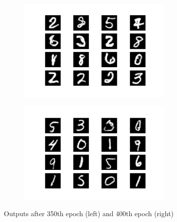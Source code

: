 \documentclass{article}
\begin{document}
\begin{appendices}
\begin{figure}[H]
\centering
\begin{subfigure}{.5\textwidth}
  \centering
  \includegraphics[width=3in]{csci-8110/hw-4/images/generated_plot_e350.png}
  \label{fig:ep20}
\end{subfigure}%
\begin{subfigure}{.5\textwidth}
  \centering
  \includegraphics[width=3in]{csci-8110/hw-4/images/generated_plot_e400.png}
  \label{fig:ep100_2}
\end{subfigure}
\caption{Outputs after 350th epoch (left) and 400th epoch (right)}
\label{fig:ep20-100}
\end{figure}


\end{appendices}
\end{document}
